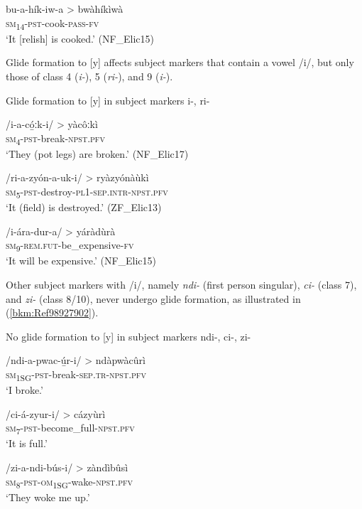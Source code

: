 \ex
bu-a-hík-iw-a > bwàhíkìwà\\
\textsc{sm}\textsubscript{14}-\textsc{pst}-cook-\textsc{pass}-\textsc{fv}\\
\glt ‘It [relish] is cooked.’ (NF\_Elic15)
\z\z

Glide formation to [y] affects subject markers that contain a vowel /i/, but only those of class 4 (\textit{i-}), 5 (\textit{ri-}), and 9 (\textit{i-}).

\ea
  Glide formation to [y] in subject markers i-, ri-

\ea
/i-a-có̲ːk-i/ > yàcôːkì\\
\textsc{sm}\textsubscript{4}-\textsc{pst}-break-\textsc{npst}.\textsc{pfv}\\
\glt ‘They (pot legs) are broken.’ (NF\_Elic17)

\ex
/ri-a-zyón-a-uk-i/ > ryàzyónàùkì\\
\textsc{sm}\textsubscript{5}-\textsc{pst}-destroy-\textsc{pl}1-\textsc{sep}.\textsc{intr}-\textsc{npst}.\textsc{pfv}\\
\glt ‘It (field) is destroyed.’ (ZF\_Elic13)

\ex
/i-ára-dur-a/ > yáràdùrà\\
\textsc{sm}\textsubscript{9}-\textsc{rem}.\textsc{fut}-be\_expensive-\textsc{fv}\\
\glt ‘It will be expensive.’ (NF\_Elic15)
\z\z

Other subject markers with /i/, namely \textit{ndi-} (first person singular), \textit{ci-} (class 7), and \textit{zi-} (class 8/10), never undergo glide formation, as illustrated in (\ref{bkm:Ref98927902}).

\ea
\label{bkm:Ref98927902}
  No glide formation to [y] in subject markers ndi-, ci-, zi-

\ea
/ndi-a-pwac-ú̲r-i/ > ndàpwàcûrì\\
\textsc{sm}\textsubscript{1SG}-\textsc{pst}-break-\textsc{sep}.\textsc{tr}-\textsc{npst}.\textsc{pfv}\\
\glt ‘I broke.’

\ex
/ci-á-zyur-i/ > cázyùrì\\
\textsc{sm}\textsubscript{7}-\textsc{pst}-become\_full-\textsc{npst}.\textsc{pfv}\\
\glt ‘It is full.’

\ex
/zi-a-ndi-bús-i/ > zàndìbûsì\\
\textsc{sm}\textsubscript{8}-\textsc{pst}-\textsc{om}\textsubscript{1SG}-wake-\textsc{npst}.\textsc{pfv}\\
\glt ‘They woke me up.’
\z\z

